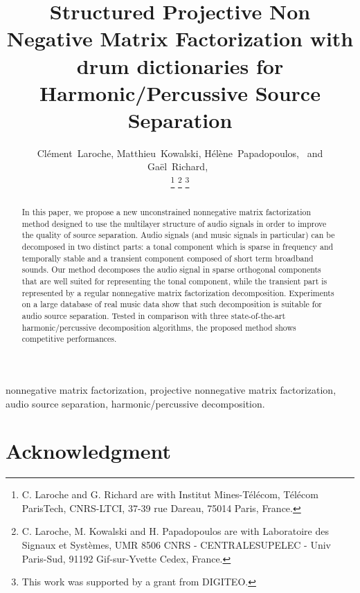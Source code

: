 \documentclass[journal]{IEEEtran}
\begin{document}
\title{Structured Projective Non Negative Matrix Factorization with drum dictionaries for Harmonic/Percussive Source Separation}

\author{Cl\'{e}ment~Laroche,
        Matthieu~Kowalski,
        H\'{e}l\`{e}ne~Papadopoulos,~
        and Ga\"{el}~Richard,~%
        
\thanks{C. Laroche and G. Richard are with Institut Mines-T\'el\'ecom, T\'el\'ecom ParisTech, CNRS-LTCI, 37-39 rue Dareau, 75014 Paris, France.}
\thanks{ C. Laroche, M. Kowalski and H. Papadopoulos are with Laboratoire des Signaux et Syst\`emes, UMR
  8506 CNRS - CENTRALESUPELEC - Univ Paris-Sud, 91192 Gif-sur-Yvette Cedex,
  France.}
\thanks{This work was supported by a grant from DIGITEO.}}



\maketitle


\begin{abstract}
In this paper, we propose a new unconstrained nonnegative matrix factorization method designed to use the multilayer structure of audio signals in order to improve the quality of source separation. Audio signals (and music signals in particular) can be decomposed in two distinct parts: a tonal component which is sparse in frequency and temporally stable and a transient component composed of short term broadband sounds. Our method decomposes the audio signal in sparse orthogonal components that are well suited for representing the tonal component, while the transient part is represented by a regular nonnegative matrix factorization decomposition. Experiments on a large database of real music data show that such decomposition is suitable for audio source separation. Tested in comparison with three state-of-the-art harmonic/percussive decomposition algorithms, the proposed method shows competitive performances.
\end{abstract}


\begin{IEEEkeywords}
nonnegative matrix factorization, projective nonnegative matrix factorization, audio source separation, harmonic/percussive decomposition.
\end{IEEEkeywords}

















\section*{Acknowledgment}






\end{document}

